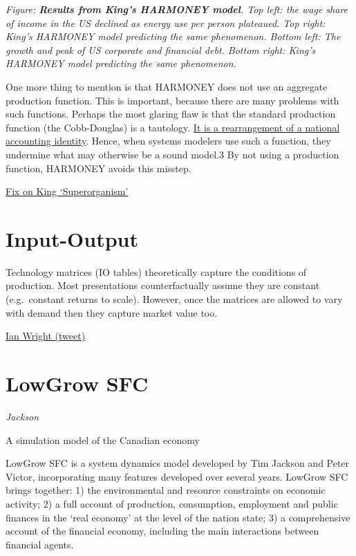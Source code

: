 \documentclass[
]{book}
\begin{document}
\emph{Figure: \textbf{Results from King's HARMONEY model}. Top left: the wage share of income in the US declined as energy use per person plateaued. Top right: King's HARMONEY model predicting the same phenomenon. Bottom left: The growth and peak of US corporate and financial debt. Bottom right: King's HARMONEY model predicting the same phenomenon.}

One more thing to mention is that HARMONEY does not use an aggregate production function. This is important, because there are many problems with such functions. Perhaps the most glaring flaw is that the standard production function (the Cobb-Douglas) is a tautology. \href{https://economicsfromthetopdown.com/2020/06/10/economic-growth-theory-bah-humbug/}{It is a rearrangement of a national accounting identity}. Hence, when systems modelers use such a function, they undermine what may otherwise be a sound model.3 By not using a production function, HARMONEY avoids this misstep.

\href{https://economicsfromthetopdown.com/2021/03/05/a-review-of-carey-kings-the-economic-superorganism/}{Fix on King `Superorganism'}

\hypertarget{input-output}{%
\section{Input-Output}\label{input-output}}

Technology matrices (IO tables) theoretically capture the conditions of production. Most presentations counterfactually assume they are constant (e.g.~constant returns to scale). However, once the matrices are allowed to vary with demand then they capture market value too.

\href{https://twitter.com/ianpaulwright/status/1552159460277239810}{Ian Wright (tweet)}

\hypertarget{lowgrow-sfc}{%
\section{LowGrow SFC}\label{lowgrow-sfc}}

\emph{Jackson}

A simulation model of the Canadian economy

LowGrow SFC is a system dynamics model developed by Tim Jackson and Peter Victor, incorporating many features developed over several years. LowGrow SFC brings together: 1) the environmental and resource constraints on economic activity; 2) a full account of production, consumption, employment and public finances in the `real economy' at the level of the nation state; 3) a comprehensive account of the financial economy, including the main interactions between financial agents.
\end{document}
